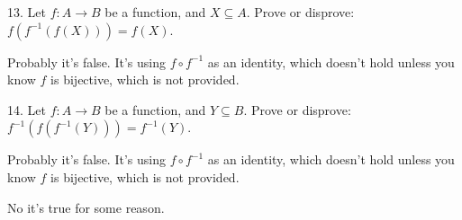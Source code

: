 \documentclass{idrisMemo}
\begin{document}
\begin{prooflist}{13. Let $f: A \rightarrow B$ be a function, and $X \subseteq
    A$. Prove or disprove: $f\left(f^{-1}(f(X))\right)=f(X)$.}
\item Probably it's false. It's using $f\circ f^{-1}$ as an identity, which
    doesn't hold unless you know $f$ is bijective, which is not provided.
\end{prooflist}

\begin{prooflist}{14. Let $f: A \rightarrow B$ be a function, and $Y \subseteq
    B$. Prove or disprove:
$f^{-1}\left(f\left(f^{-1}(Y)\right)\right)=f^{-1}(Y)$.}
\item Probably it's false. It's using $f\circ f^{-1}$ as an identity, which
    doesn't hold unless you know $f$ is bijective, which is not provided.
\item No it's true for some reason.
\end{prooflist}
\end{document}
